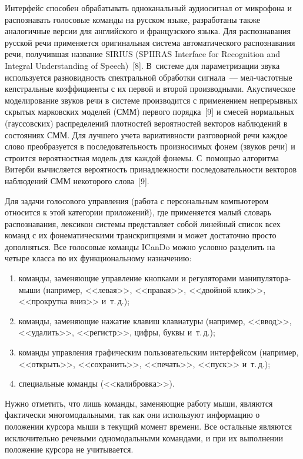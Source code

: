 \begin{multicols}{2}
  Интерфейс способен обрабатывать одноканальный аудиосигнал от 
микрофона и распознавать голосовые команды на русском языке, разработаны 
также аналогичные версии для английского и французского языка. Для 
распознавания русской речи применяется оригинальная система 
автоматического распознавания речи, получившая название SIRIUS (SPIIRAS 
Interface for Recognition and Integral Understanding of Speech)~[8]. В~системе для 
параметризации звука используется разновидность спектральной обработки 
сигнала~--- мел-час\-тот\-ные кепстральные коэффициенты с их первой и 
второй производными. Акустическое моделирование звуков речи в системе 
производится с применением непрерывных скрытых марковских моделей 
(СММ) первого порядка~[9] и смесей нормальных (гауссовских) распределений 
плотностей вероятностей векторов наблюдений в состояниях СММ. Для 
лучшего учета вариативности разговорной речи каждое слово преобразуется в 
последовательность произносимых фонем (звуков речи) и строится 
вероятностная модель для каждой фонемы. С~помощью алгоритма Витерби 
вычисляется вероятность принадлежности последовательности векторов 
наблюдений СММ некоторого слова~[9]. 
  
  Для задачи голосового управления (работа с персональным компьютером 
относится к этой категории приложений), где применяется малый словарь 
распознавания, лексикон системы представляет собой линейный список всех 
команд с их фонематическими транскрипциями и может достаточно прос\-то 
дополняться. Все голосовые команды \mbox{ICanDo} можно условно разделить на 
четыре класса по их функциональному назначению: 
  \begin{enumerate}[(1)]
\item команды, заменяющие управление кнопками и регуляторами 
манипулятора-мыши (например, <<левая>>, <<правая>>, <<двойной клик>>, 
<<прокрутка вниз>> и~т.\,д.); 
\item команды, заменяющие нажатие клавиш клавиатуры (например, <<ввод>>, 
<<удалить>>, <<регистр>>, цифры, буквы и~т.\,д.); 
\item команды управления графическим пользовательским интерфейсом 
(например, <<открыть>>, <<сохранить>>, <<печать>>, <<пуск>> и~т.\,д.); 
\item специальные команды (<<калибровка>>). 
\end{enumerate}
  
  Нужно отметить, что лишь команды, заменяющие работу мыши, являются 
фактически многомодальными, так как они используют информацию о 
положении курсора мыши в текущий момент времени. Все остальные являются 
исключительно речевыми одномодальными командами, и при их выполнении 
положение курсора не учитывается.
  

\end{multicols}
